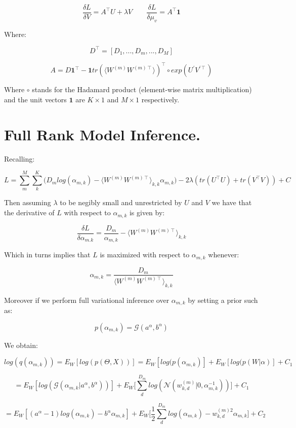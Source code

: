 \documentclass{article}
\begin{document}
$$\frac{\delta L}{\delta V} = A^\intercal U + \lambda V \qquad \frac{\delta L}{\delta \mu_v} = A^\intercal \textbf{1}$$

Where:

$$D^\intercal = [D_1,...,D_m,...,D_M]$$

$$A = D\textbf{1}^\intercal - \textbf{1} tr(\langle W^{(m)}W^{(m)\intercal}\rangle)^\intercal \circ exp(U^\prime V^{\prime \intercal})$$

Where $\circ$ stands for the Hadamard product (element-wise matrix multiplication) and the unit vectors $\textbf{1}$ are $K \times 1$ and $M \times 1$ respectively.

\section*{Full Rank Model Inference.}

Recalling:  

$$L = \sum_m^M{\sum_k^K{\Big(D_mlog(\alpha_{m,k}) - \langle W^{(m)}W^{(m)\intercal}\rangle_{k,k} \alpha_{m,k}}}\Big)-2\lambda (tr(U^\intercal U) + tr(V^\intercal V)) + C$$

Then assuming $\lambda$ to be negibly small and unrestricted by $U$ and $V$ we have that the derivative of $L$ with respect to $\alpha_{m,k}$ is given by:

$$\frac{\delta L}{\delta \alpha_{m.k}} = \frac{D_m}{\alpha_{m,k}} - \langle W^{(m)}W^{(m)\intercal}\rangle_{k,k}$$

Which in turns implies that $L$ is maximized with respect to $\alpha_{m,k}$ whenever:

$$\alpha_{m,k} = \frac{D_m}{\langle W^{(m)}W^{(m)\intercal}\rangle_{k,k}}$$

Moreover if we perform full variational inference over $\alpha_{m,k}$ by setting a prior such as:

$$p(\alpha_{m,k}) = \mathcal{G}(a^\alpha,b^\alpha)$$

We obtain:

$$log(q(\alpha_{m,k})) = E_{W}[log(p(\Theta,X))] = E_{W}[log(p(\alpha_{m,k})] + E_{W}[log(p(W|\alpha)] + C_1$$

$$ = E_{W}[log(\mathcal{G}(\alpha_{m,k}|a^\alpha,b^\alpha))] +  E_{W}\bigg[\sum_{d}^{D_m}{log(\mathcal{N}(w_{k,d}^{(m)}|0, \alpha_{m,k}^{-1}))}\bigg]+C_1$$

$$= E_W[(a^\alpha-1)log(\alpha_{m,k}) - b^\alpha\alpha_{m,k}] + E_W\bigg[\frac{1}{2}\sum_d^{D_m}{log(\alpha_{m,k}) - w_{k,d}^{(m)2} \alpha_{m,k} }\bigg] + C_2$$
\end{document}
